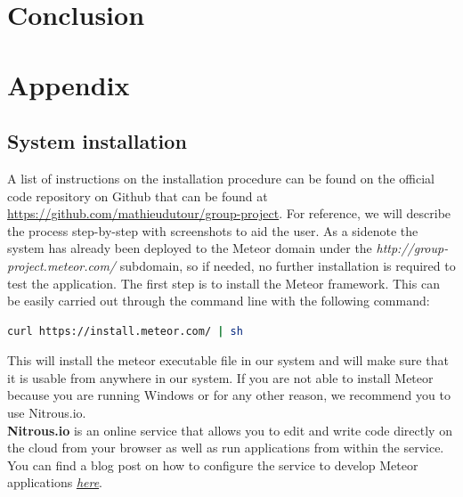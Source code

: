 \documentclass{article}
\begin{document}
\section{Conclusion}

\section{Appendix}





\subsection{System installation}

A list of instructions on the installation procedure can be found on the official code repository on Github that can be found at \url{https://github.com/mathieudutour/group-project}. For reference, we will describe the process step-by-step with screenshots to aid the user. As a sidenote the system has already been deployed to the Meteor domain under the \emph{http://group-project.meteor.com/} subdomain, so if needed, no further installation is required to test the application. The first step is to install the Meteor framework. This can be easily carried out through the command line with the following command:

\vspace{5mm} %

\begin{lstlisting}[language=sh]
curl https://install.meteor.com/ | sh
\end{lstlisting}

\vspace{5mm} %

\noindent This will install the meteor executable file in our system and will make sure that it is usable from anywhere in our system. If you are not able to install Meteor because you are running Windows or for any other reason, we recommend you to use Nitrous.io.\\

\noindent\textbf{Nitrous.io} is an online service that allows you to edit and write code directly on the cloud from  your browser as well as run applications from within the service. You can find a blog post on how to configure the service to develop Meteor applications \textit{\href{https://www.discovermeteor.com/blog/meteor-nitrous}{here}}.\\
\end{document}
